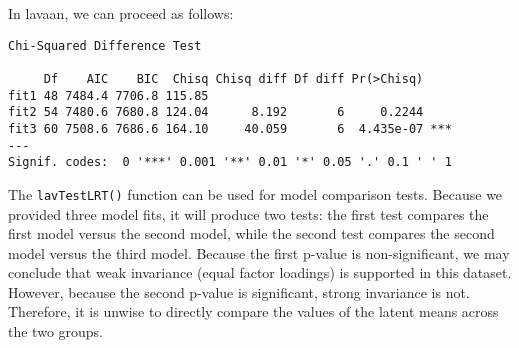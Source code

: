 In lavaan, we can proceed as follows:

\begin{Shaded}
\begin{Highlighting}[]
\OtherTok{\textless{}{-}} 

\OtherTok{\textless{}{-}}  \NormalTok{)}

\OtherTok{\textless{}{-}}  \NormalTok{,}
             \NormalTok{)}

\OtherTok{\textless{}{-}}  \NormalTok{,}
             \NormalTok{(}\NormalTok{, }\NormalTok{))}

\end{Highlighting}
\end{Shaded}

\begin{verbatim}
Chi-Squared Difference Test

     Df    AIC    BIC  Chisq Chisq diff Df diff Pr(>Chisq)    
fit1 48 7484.4 7706.8 115.85                                  
fit2 54 7480.6 7680.8 124.04      8.192       6     0.2244    
fit3 60 7508.6 7686.6 164.10     40.059       6  4.435e-07 ***
---
Signif. codes:  0 '***' 0.001 '**' 0.01 '*' 0.05 '.' 0.1 ' ' 1
\end{verbatim}

The \texttt{lavTestLRT()} function can be used for model comparison
tests. Because we provided three model fits, it will produce two tests:
the first test compares the first model versus the second model, while
the second test compares the second model versus the third model.
Because the first p-value is non-significant, we may conclude that weak
invariance (equal factor loadings) is supported in this dataset.
However, because the second p-value is significant, strong invariance is
not. Therefore, it is unwise to directly compare the values of the
latent means across the two groups.
